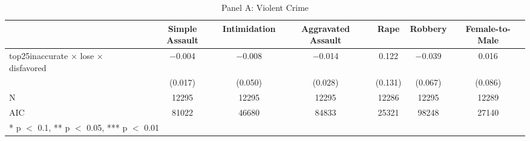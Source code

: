 \begin{table}
\centering
\caption{Panel A: Violent Crime}
\centering
\begin{tabular}[t]{lcccccc}
\toprule
  & Simple Assault & Intimidation & Aggravated Assault & Rape & Robbery & Female-to-Male\\
\midrule
top25inaccurate × lose × disfavored & \num{-0.004} & \num{-0.008} & \num{-0.014} & \num{0.122} & \num{-0.039} & \num{0.016}\\
 & (\num{0.017}) & (\num{0.050}) & (\num{0.028}) & (\num{0.131}) & (\num{0.067}) & (\num{0.086})\\
\midrule
N & \num{12295} & \num{12295} & \num{12295} & \num{12286} & \num{12295} & \num{12289}\\
AIC & \num{81022} & \num{46680} & \num{84833} & \num{25321} & \num{98248} & \num{27140}\\
\bottomrule
\multicolumn{7}{l}{\rule{0pt}{1em}* p $<$ 0.1, ** p $<$ 0.05, *** p $<$ 0.01}\\
\end{tabular}
\end{table}
